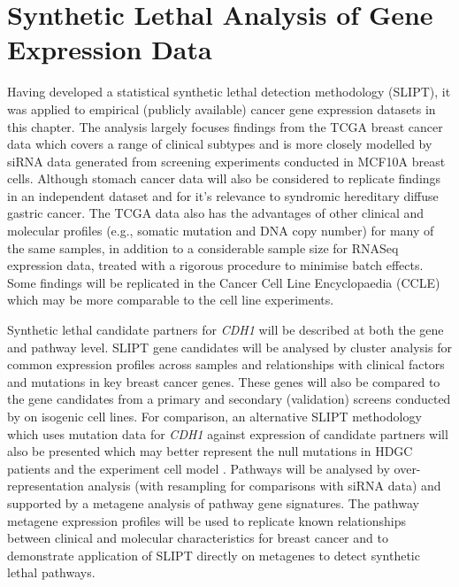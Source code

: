 \chapter{Synthetic Lethal Analysis of Gene Expression Data}
\label{chap:SLIPT}

Having developed a statistical synthetic lethal detection methodology (SLIPT), it was applied to empirical (publicly available) cancer gene expression datasets in this chapter. The analysis largely focuses findings from the TCGA breast cancer data \citep{TCGA2012} which covers a range of clinical subtypes and is more closely modelled by siRNA data \citep{Telford2015} generated from screening experiments conducted in MCF10A breast cells. Although stomach cancer data will also be considered to replicate findings in an independent dataset and for it's relevance to syndromic hereditary diffuse gastric cancer. The TCGA data also has the advantages of other clinical and molecular profiles (e.g., somatic mutation and DNA copy number) for many of the same samples, in addition to a considerable sample size for RNASeq expression data, treated with a rigorous procedure to minimise batch effects. Some findings will be replicated in the Cancer Cell Line Encyclopaedia (CCLE) \citep{Barretina2012} which may be more comparable to the cell line experiments.

Synthetic lethal candidate partners for \textit{CDH1} will be described at both the gene and pathway level. SLIPT gene candidates will be analysed by cluster analysis for common expression profiles across samples and relationships with clinical factors and mutations in key breast cancer genes. These genes will also be compared to the gene candidates from a primary and secondary (validation) screens conducted by \citet{Telford2015} on isogenic cell lines. For comparison, an alternative SLIPT methodology which uses mutation data for \textit{CDH1} against expression of candidate partners will also be presented which may better represent the null mutations in HDGC patients and the experiment cell model \citep{Chen2014}. Pathways will be analysed by over-representation analysis (with resampling for comparisons with siRNA data) and supported by a metagene analysis of pathway gene signatures. The pathway metagene expression profiles will be used to replicate known relationships between clinical and molecular characteristics for breast cancer and to demonstrate application of SLIPT directly on metagenes to detect synthetic lethal pathways.

